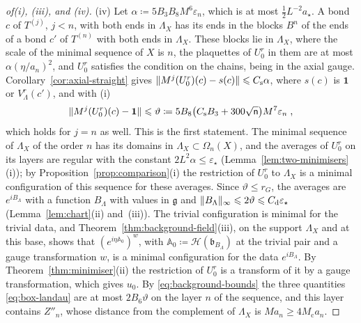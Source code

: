 \documentclass[11pt]{preprint}
\newcommand{\id}{\mathbf 1}
\DeclarePairedDelimiter{\norm}{\lVert}{\rVert}
\numberwithin{equation}{section}
\begin{document}
\begin{proof}[of\emph{(i)}, \emph{(iii)}, and \emph{(iv)}]
(iv) Let $\alpha \coloneqq 5B_3B_8M^6\varepsilon_n$, which is at most $\frac{1}{2}L^{-2}a_\star$. A bond $c$ of $T^{(j)}$, $j < n$, with both ends in $\Lambda_X$ has its ends in the blocks $B^n$ of the ends of a bond $c'$ of $T^{(n)}$ with both ends in $\Lambda_X$. These blocks lie in $\Lambda_X$, where the scale of the minimal sequence of $X$ is $n$, the plaquettes of $U^r_0$ in them are at most $\alpha(\eta/a_n)^2$, and $U^r_0$ satisfies the condition on the chains, being in the axial gauge. Corollary~\ref{cor:axial-straight} gives $\norm{M^j(U^r_0)(c) - s(c)} \leqslant C_{\mathrm s}\alpha$, where $s(c)$ is $\id$ or $V^r_\Lambda(c')$, and with (i)
\[
    \norm{M^j(U^r_0)(c) - \id} \leqslant \vartheta \coloneqq 5B_8\bigl(C_{\mathrm s}B_3 + 300\sqrt{\mathsf n}\bigr)M^7\varepsilon_n\;,
\]
which holds for $j = n$ as well. This is the first statement. The minimal sequence of $\Lambda_X$ of the order $n$ has its domains in $\Lambda_X \subset \Omega_n(X)$, and the averages of $U^r_0$ on its layers are regular with the constant $2L^2\alpha \leqslant \varepsilon_\star$ (Lemma~\ref{lem:two-minimisers}(i)); by Proposition~\ref{prop:comparison}(i) the restriction of $U^r_0$ to $\Lambda_X$ is a minimal configuration of this sequence for these averages. Since $\vartheta \leqslant r_G$, the averages are $e^{iB_\Lambda}$ with a function $B_\Lambda$ with values in $\mathfrak g$ and $\norm{B_\Lambda}_\infty \leqslant 2\vartheta \leqslant C_{\mathrm d}\varepsilon_\star$ (Lemma~\ref{lem:chart}(ii) and~(iii)). The trivial configuration is minimal for the trivial data, and Theorem~\ref{thm:background-field}(iii), on the support $\Lambda_X$ and at this base, shows that $(e^{i\eta\mathbb A_0})^w$, with $\mathbb A_0 \coloneqq \mathcal H(\mathfrak b_{B_\Lambda})$ at the trivial pair and a gauge transformation $w$, is a minimal configuration for the data $e^{iB_\Lambda}$. By Theorem~\ref{thm:minimiser}(ii) the restriction of $U^r_0$ is a transform of it by a gauge transformation, which gives $u_0$. By \eqref{eq:background-bounds} the three quantities \eqref{eq:box-landau} are at most $2B_6\vartheta$ on the layer $n$ of the sequence, and this layer contains $Z''_n$, whose distance from the complement of $\Lambda_X$ is $Ma_n \geqslant 4M_{\mathrm c}a_n$.
\end{proof}
\end{document}

